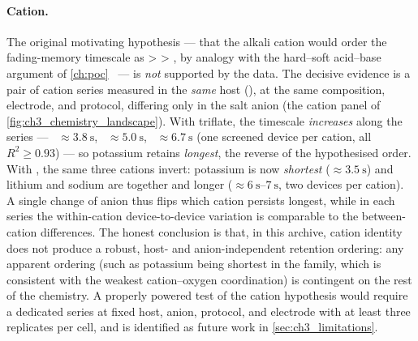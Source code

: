 \documentclass[12pt, twoside]{report}
\begin{document}
\paragraph{Cation.} The original motivating hypothesis --- that the alkali cation would order the fading-memory timescale as  >  > , by analogy with the hard--soft acid--base argument of \cref{ch:poc}~\cite{Pearson1963} --- is \emph{not} supported by the data. The decisive evidence is a pair of cation series measured in the \emph{same} host (\TMPE{}), at the same composition, electrode, and protocol, differing only in the salt anion (the cation panel of \cref{fig:ch3_chemistry_landscape}). With triflate, the timescale \emph{increases} along the series --- ~\(\approx\SI{3.8}{\second}\), ~\(\approx\SI{5.0}{\second}\), ~\(\approx\SI{6.7}{\second}\) (one screened device per cation, all \(R^2\ge0.93\)) --- so potassium retains \emph{longest}, the reverse of the hypothesised order. With \TFSI{}, the same three cations invert: potassium is now \emph{shortest} (\(\approx\SI{3.5}{\second}\)) and lithium and sodium are together and longer (\(\approx\SIrange{6}{7}{\second}\), two devices per cation). A single change of anion thus flips which cation persists longest, while in each series the within-cation device-to-device variation is comparable to the between-cation differences. The honest conclusion is that, in this archive, cation identity does not produce a robust, host- and anion-independent retention ordering: any apparent ordering (such as potassium being shortest in the \TFSI{} family, which is consistent with the weakest cation--oxygen coordination) is contingent on the rest of the chemistry. A properly powered test of the cation hypothesis would require a dedicated series at fixed host, anion, protocol, and electrode with at least three replicates per cell, and is identified as future work in \cref{sec:ch3_limitations}.
\end{document}
